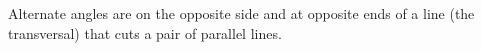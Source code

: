Alternate angles are on the opposite side and at opposite ends of a 
line (the transversal) that 
cuts a pair of parallel lines.
